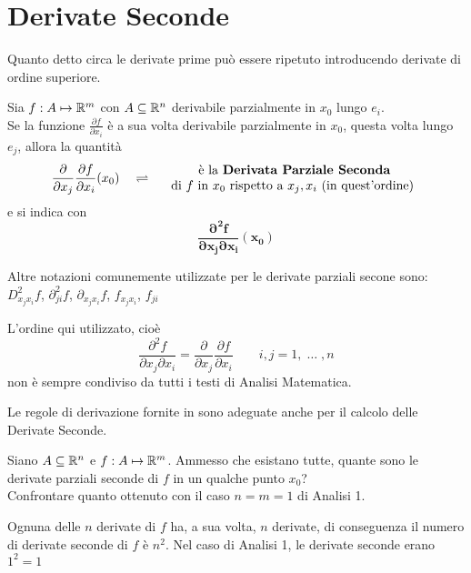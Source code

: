 \section{Derivate Seconde}
Quanto detto circa le derivate prime può essere ripetuto introducendo derivate di ordine superiore.
\begin{definition}
	Sia $f: A \mapsto \mathbb{R}^m$ con $A \subseteq \mathbb{R}^n$ derivabile parzialmente in $x_0$ lungo $e_i$.\\
	Se la funzione $\frac{\partial f}{\partial x_i}$ è a sua volta derivabile parzialmente in $x_0$, questa volta lungo $e_j$, allora la quantità
	\[
		\frac{\partial}{\partial x_j} \frac{\partial f}{\partial x_i} (x_0)
		\quad \rightleftharpoons \quad
		\begin{array}{c}
			\text{ è la \textbf{Derivata Parziale Seconda}}\\
			\text{di } f \text{ in } x_0 \text{ rispetto a } x_j, x_i \text{ (in quest'ordine)}
		\end{array}
	\]
	e si indica con
	\[\boldsymbol{\frac{\partial^2 f}{\partial x_j \partial x_i} (x_0)}\]
	\vspace*{-\baselineskip}
	\begin{note}
		Altre notazioni comunemente utilizzate per le derivate parziali secone sono: $D^2_{x_j x_i} f$, $\partial^2_{ji} f$, $\partial_{x_j x_i} f$, $f_{x_j x_i}$, $f_{ji}$
	\end{note}
	\begin{note}
		L'ordine qui utilizzato, cioè
		\[\frac{\partial^2 f}{\partial x_j \partial x_i} = \frac{\partial}{\partial x_j} \frac{\partial f}{\partial x_i} \qquad i,j = 1,\;\dotsc\;,n\]
		non è sempre condiviso da tutti i testi di Analisi Matematica.
	\end{note}
\end{definition}
\begin{observation}
	Le regole di derivazione fornite in  sono adeguate anche per il calcolo delle Derivate Seconde.
\end{observation}
\begin{exercise}
	\label{ex:num_deriv_sec}
	Siano $A \subseteq \mathbb{R}^n$ e $f:A \mapsto \mathbb{R}^m$. Ammesso che esistano tutte, quante sono le derivate parziali seconde di $f$ in un qualche punto $x_0$?\\
	Confrontare quanto ottenuto con il caso $n = m = 1$ di Analisi 1.
	\begin{solution}
		Ognuna delle $n$ derivate di $f$ ha, a sua volta, $n$ derivate, di conseguenza il numero di derivate seconde di $f$ è $n^2$. Nel caso di Analisi 1, le derivate seconde erano $1^2 = 1$
	\end{solution}
\end{exercise}

